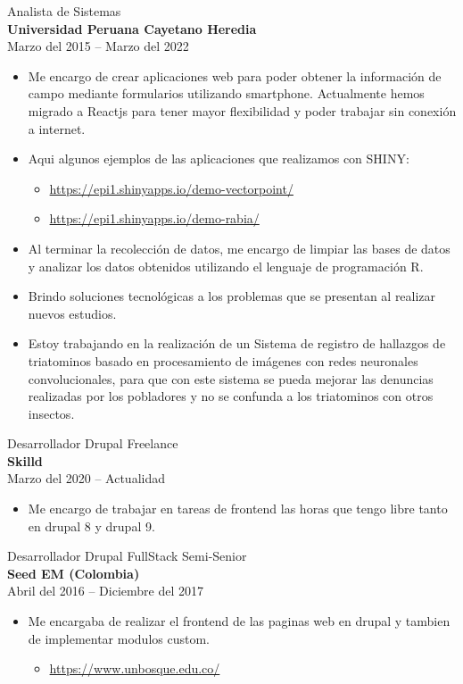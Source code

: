 \documentclass[letterpaper]{twentysecondcv} %
\begin{document}
{\Large Analista de Sistemas}\\
{\large \bf Universidad Peruana Cayetano Heredia}\\
{Marzo del 2015 -- Marzo del 2022}
\begin{itemize}
\item Me encargo de crear aplicaciones web para poder obtener la información de campo mediante formularios utilizando smartphone. Actualmente hemos migrado a Reactjs para tener mayor flexibilidad y poder trabajar sin conexión a internet. 

\item Aqui algunos ejemplos de las aplicaciones que realizamos con SHINY:
  \begin{itemize}
	\item {\url{https://epi1.shinyapps.io/demo-vectorpoint/}}
	\item {\url{https://epi1.shinyapps.io/demo-rabia/}}\\
  \end{itemize}
\item Al terminar la recolección de datos, me encargo de limpiar las bases de datos y analizar los datos obtenidos utilizando el lenguaje de programación R.
\item Brindo soluciones tecnológicas a los problemas que se presentan al realizar nuevos estudios.
\item Estoy trabajando en la realización de un Sistema de registro de hallazgos de triatominos basado en procesamiento de imágenes con redes neuronales convolucionales, para que con este sistema se pueda mejorar las denuncias realizadas por los pobladores y no se confunda a los triatominos con otros insectos.\\
\end{itemize}

{\Large Desarrollador Drupal Freelance}\\
{\large \bf Skilld}\\
{Marzo del 2020 -- Actualidad}
\begin{itemize}
\item Me encargo de trabajar en tareas de frontend las horas que tengo libre tanto en drupal 8 y drupal 9.\\
\end{itemize}

{\Large Desarrollador Drupal FullStack Semi-Senior}\\
{\large \bf Seed EM (Colombia)}\\
{Abril del 2016 -- Diciembre del 2017}
\begin{itemize}
\item Me encargaba de realizar el frontend de las paginas web en drupal y tambien de implementar modulos custom. 
  \begin{itemize}
	\item {\url{https://www.unbosque.edu.co/}}\\
  \end{itemize}
\end{itemize}
\end{document}
